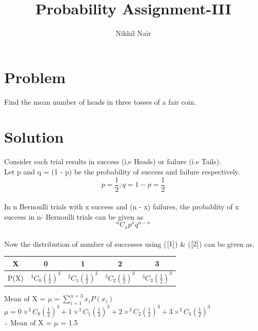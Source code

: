\documentclass[journal,12pt,twocolumn]{IEEEtran}
\title{\mytitle}
\title{
Probability Assignment-III
}
\author{Nikhil Nair}
\begin{document}
\maketitle
\bigskip


\section{\textbf{Problem }}
Find the mean number of heads in three tosses of a fair coin.


\section{\textbf{Solution }}
Consider each trial results in success (i.e Heads) or failure (i.e Tails).
\\
 
Let p and q = (1 - p) be the probability of success and failure respectively.\\
\begin{equation}
p = \frac{1}{2} ;  q = 1 - p = \frac{1}{2}    \label{1}
\end{equation}\\
In n Bernoulli trials with x success and (n - x) failures, the probablity of x success in n- Bernoulli trials can be given as\\
\begin{equation}
^nC_xp^{x} q^{n-x}  \label{2}
\end{equation}
\\
Now the distribution of number of successes using ($\ref{1}$) $\&$ ($\ref{2}$) can be given as,
\begin{center}
\begin{tabular}{ |c |c |c |c |c |}
 \hline
 X  &  0 &  1  &  2 & 3\\
 \hline
 P(X)  &  $^3C_0(\frac{1}{2})^{3}$  & $^3C_1(\frac{1}{2})^{3}$  &  $^3C_2(\frac{1}{2})^{3}$ & $^3C_3(\frac{1}{2})^{3}$\\
 \hline
 
 \end{tabular}

\end{center}

 Mean of X = $\mu = \sum_{i=1}^{n=3} x_i P(x_i)$\\

$\mu = 0 \times ^3C_0(\frac{1}{2})^{3} + 1 \times ^3C_1(\frac{1}{2})^{3} + 2 \times ^3C_2(\frac{1}{2})^{3} + 3 \times ^3C_3(\frac{1}{2})^{3}$\\

$\therefore$ Mean of X = $\mu$ = 1.5
\end{document}
